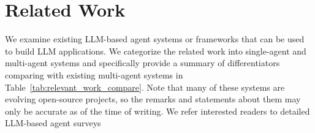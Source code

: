 \clearpage
\section{Related Work} \label{sec:related_work}

We examine existing LLM-based agent systems or frameworks that can be used to build LLM applications. We categorize the related work into single-agent and multi-agent systems and specifically provide a summary of differentiators comparing \libName with existing multi-agent systems in Table~\ref{tab:relevant_work_compare}. Note that many of these systems are evolving open-source projects, so the remarks and statements about them may only be accurate as of the time of writing.
We refer interested readers to detailed LLM-based agent surveys ~\cite{xi2023rise,wang2023survey}

